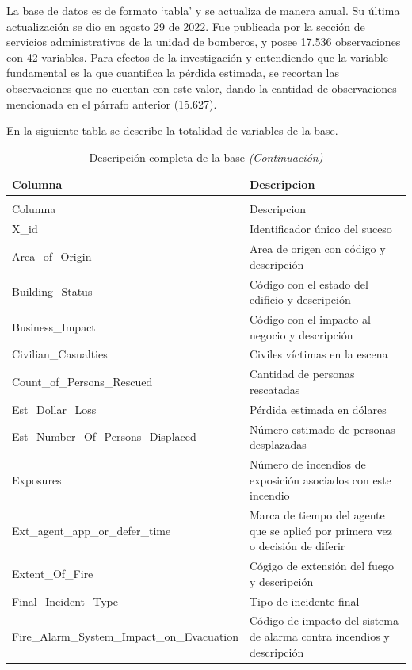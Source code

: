 \documentclass[
  oneside]{memoir}
\begin{document}
La base de datos es de formato `tabla' y se actualiza de manera anual.
Su última actualización se dio en agosto 29 de 2022. Fue publicada por
la sección de servicios administrativos de la unidad de bomberos, y
posee 17.536 observaciones con 42 variables. Para efectos de la
investigación y entendiendo que la variable fundamental es la que
cuantifica la pérdida estimada, se recortan las observaciones que no
cuentan con este valor, dando la cantidad de observaciones mencionada en
el párrafo anterior (15.627).

En la siguiente tabla se describe la totalidad de variables de la base.

\begin{longtable}[t]{l|>{\raggedright\arraybackslash}p{7cm}}
\caption{\label{tab:unnamed-chunk-2}Descripción completa de la base}\\
\hline
Columna & Descripcion\\
\hline
\endfirsthead
\caption[]{Descripción completa de la base \textit{(Continuación)}}\\
\hline
Columna & Descripcion\\
\hline
\endhead
X\_id & Identificador único del suceso\\
\hline
Area\_of\_Origin & Area de origen con código y descripción\\
\hline
Building\_Status & Código con el estado del edificio y descripción\\
\hline
Business\_Impact & Código con el impacto al negocio y descripción\\
\hline
Civilian\_Casualties & Civiles víctimas en la escena\\
\hline
Count\_of\_Persons\_Rescued & Cantidad de personas rescatadas\\
\hline
Est\_Dollar\_Loss & Pérdida estimada en dólares\\
\hline
Est\_Number\_Of\_Persons\_Displaced & Número estimado de personas desplazadas\\
\hline
Exposures & Número de incendios de exposición asociados con este incendio\\
\hline
Ext\_agent\_app\_or\_defer\_time & Marca de tiempo del agente que se aplicó por primera vez o decisión de diferir\\
\hline
Extent\_Of\_Fire & Cógigo de extensión del fuego y descripción\\
\hline
Final\_Incident\_Type & Tipo de incidente final\\
\hline
Fire\_Alarm\_System\_Impact\_on\_Evacuation & Código de impacto del sistema de alarma contra incendios y descripción\\

\end{longtable}
\end{document}
